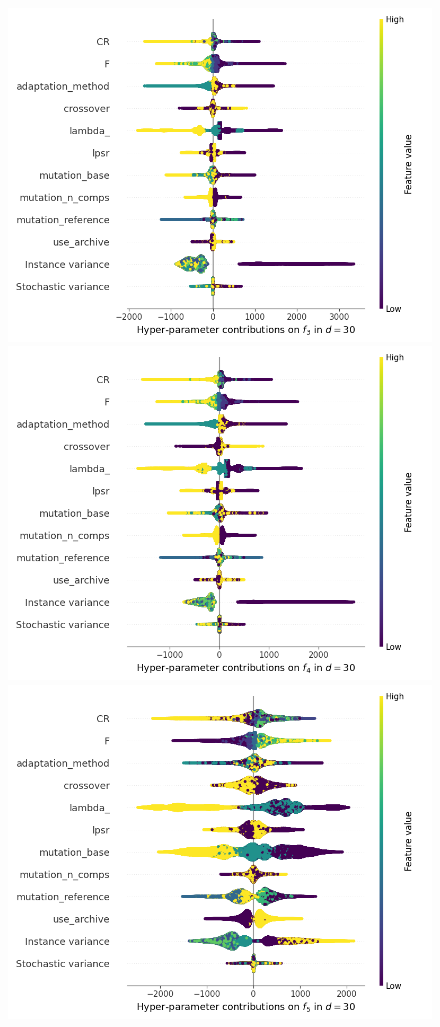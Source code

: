 \begin{figure}[t]
	\includegraphics[height=0.15\textheight,trim=60mm 0mm 30mm 0mm,clip]{de_img_new/img_summary_f3_d30.png}
	\includegraphics[height=0.15\textheight,trim=60mm 0mm 0mm 0mm,clip]{de_img_new/img_summary_f4_d30.png}
	\includegraphics[height=0.15\textheight,trim=0mm 0mm 30mm 0mm,clip]{de_img_new/img_summary_f5_d30.png}

\end{figure}
